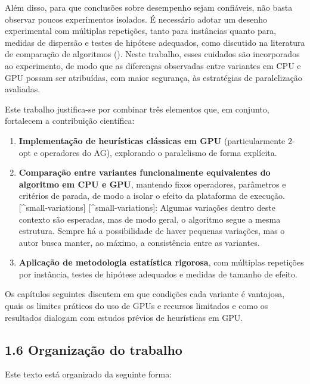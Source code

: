 Além disso, para que conclusões sobre desempenho sejam confiáveis, não
basta observar poucos experimentos isolados. É necessário adotar um
desenho experimental com múltiplas repetições, tanto para instâncias
quanto para, medidas de dispersão e testes de hipótese adequados, como
discutido na literatura de comparação de algoritmos
(). Neste trabalho, esses
cuidados são incorporados ao experimento, de modo que as diferenças
observadas entre variantes em CPU e GPU possam ser atribuídas, com maior
segurança, às estratégias de paralelização avaliadas.

Este trabalho justifica-se por combinar três elementos que, em conjunto,
fortalecem a contribuição científica:

\begin{enumerate}
\def\labelenumi{\arabic{enumi}.}
\tightlist
\item
  \textbf{Implementação de heurísticas clássicas em GPU}
  (particularmente \(2\)-opt e operadores do AG), explorando o
  paralelismo de forma explícita.
\item
  \textbf{Comparação entre variantes funcionalmente equivalentes do
  algoritmo em CPU e GPU}, mantendo fixos operadores, parâmetros e
  critérios de parada, de modo a isolar o efeito da plataforma de
  execução. {[}\^{}small-variations{]} {[}\^{}small-variations{]}:
  Algumas variações dentro deste contexto são esperadas, mas de modo
  geral, o algoritmo segue a mesma estrutura. Sempre há a possibilidade
  de haver pequenas variações, mas o autor busca manter, ao máximo, a
  consistência entre as variantes.
\item
  \textbf{Aplicação de metodologia estatística rigorosa}, com múltiplas
  repetições por instância, testes de hipótese adequados e medidas de
  tamanho de efeito.
\end{enumerate}

Os capítulos seguintes discutem em que condições cada variante é
vantajosa, quais os limites práticos do uso de GPUs e recursos limitados
e como os resultados dialogam com estudos prévios de heurísticas em GPU.

\subsection{1.6 Organização do trabalho}\label{sec-16-organizacao}

Este texto está organizado da seguinte forma:

